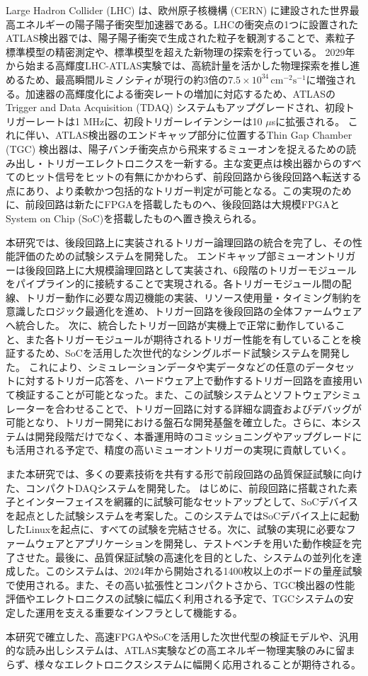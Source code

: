 Large Hadron Collider (LHC) は、欧州原子核機構 (CERN) に建設された世界最高エネルギーの陽子陽子衝突型加速器である。LHCの衝突点の1つに設置されたATLAS検出器では、陽子陽子衝突で生成された粒子を観測することで、素粒子標準模型の精密測定や、標準模型を超えた新物理の探索を行っている。
2029年から始まる高輝度LHC-ATLAS実験では、高統計量を活かした物理探索を推し進めるため、最高瞬間ルミノシティが現行の約3倍の$7.5 \times 10^{34}\, \mathrm{cm^{-2}s^{-1}}$に増強される。加速器の高輝度化による衝突レートの増加に対応するため、ATLASのTrigger and Data Acquisition (TDAQ) システムもアップグレードされ、初段トリガーレートは1 MHzに、初段トリガーレイテンシーは10 $\mu$sに拡張される。
これに伴い、ATLAS検出器のエンドキャップ部分に位置するThin Gap Chamber (TGC) 検出器は、陽子バンチ衝突点から飛来するミューオンを捉えるための読み出し・トリガーエレクトロニクスを一新する。主な変更点は検出器からのすべてのヒット信号をヒットの有無にかかわらず、前段回路から後段回路へ転送する点にあり、より柔軟かつ包括的なトリガー判定が可能となる。この実現のために、前段回路は新たにFPGAを搭載したものへ、後段回路は大規模FPGAとSystem on Chip (SoC)を搭載したものへ置き換えられる。

本研究では、後段回路上に実装されるトリガー論理回路の統合を完了し、その性能評価のための試験システムを開発した。
エンドキャップ部ミューオントリガーは後段回路上に大規模論理回路として実装され、6段階のトリガーモジュールをパイプライン的に接続することで実現される。各トリガーモジュール間の配線、トリガー動作に必要な周辺機能の実装、リソース使用量・タイミング制約を意識したロジック最適化を進め、トリガー回路を後段回路の全体ファームウェアへ統合した。
次に、統合したトリガー回路が実機上で正常に動作していること、また各トリガーモジュールが期待されるトリガー性能を有していることを検証するため、SoCを活用した次世代的なシングルボード試験システムを開発した。
これにより、シミュレーションデータや実データなどの任意のデータセットに対するトリガー応答を、ハードウェア上で動作するトリガー回路を直接用いて検証することが可能となった。また、この試験システムとソフトウェアシミュレーターを合わせることで、トリガー回路に対する詳細な調査およびデバッグが可能となり、トリガー開発における盤石な開発基盤を確立した。さらに、本システムは開発段階だけでなく、本番運用時のコミッショニングやアップグレードにも活用される予定で、精度の高いミューオントリガーの実現に貢献していく。

また本研究では、多くの要素技術を共有する形で前段回路の品質保証試験に向けた、コンパクトDAQシステムを開発した。
はじめに、前段回路に搭載された素子とインターフェイスを網羅的に試験可能なセットアップとして、SoCデバイスを起点とした試験システムを考案した。このシステムではSoCデバイス上に起動したLinuxを起点に、すべての試験を完結させる。次に、試験の実現に必要なファームウェアとアプリケーションを開発し、テストベンチを用いた動作検証を完了させた。最後に、品質保証試験の高速化を目的とした、システムの並列化を達成した。このシステムは、2024年から開始される1400枚以上のボードの量産試験で使用される。また、その高い拡張性とコンパクトさから、TGC検出器の性能評価やエレクトロニクスの試験に幅広く利用される予定で、TGCシステムの安定した運用を支える重要なインフラとして機能する。

本研究で確立した、高速FPGAやSoCを活用した次世代型の検証モデルや、汎用的な読み出しシステムは、ATLAS実験などの高エネルギー物理実験のみに留まらず、様々なエレクトロニクスシステムに幅開く応用されることが期待される。

